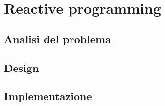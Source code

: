 \documentclass[report]{subfiles}
\begin{document}
	\section{Reactive programming}
	\subsection{Analisi del problema}
	\subsection{Design}
	\subsection{Implementazione}
\end{document}
